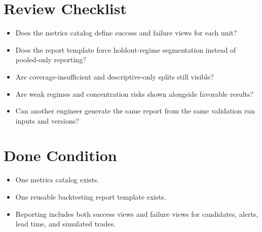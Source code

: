\documentclass{article}
\begin{document}
\section*{Review Checklist}

\begin{itemize}
\item Does the metrics catalog define success and failure views for each unit?
\item Does the report template force holdout-regime segmentation instead of pooled-only reporting?
\item Are coverage-insufficient and descriptive-only splits still visible?
\item Are weak regimes and concentration risks shown alongside favorable results?
\item Can another engineer generate the same report from the same validation run inputs and versions?
\end{itemize}

\section*{Done Condition}

\begin{itemize}
\item One metrics catalog exists.
\item One reusable backtesting report template exists.
\item Reporting includes both success views and failure views for candidates, alerts, lead time, and simulated trades.
\end{itemize}
\end{document}
